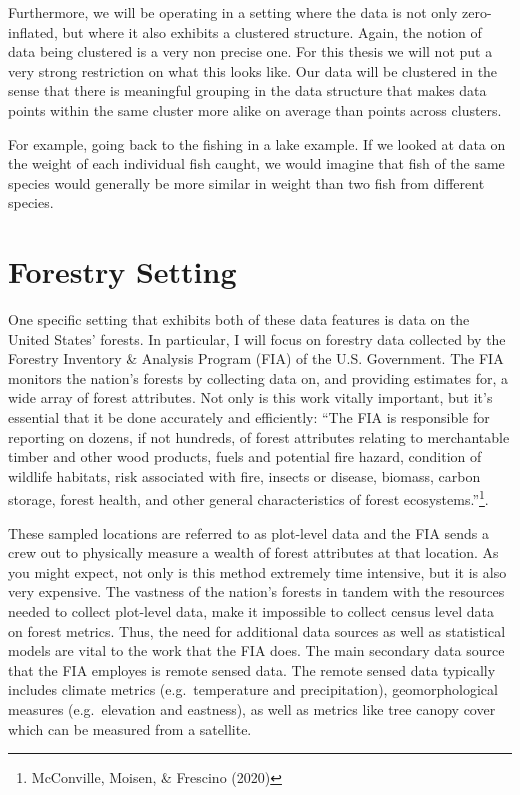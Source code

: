 \documentclass[12pt,twoside]{reedthesis}
\begin{document}
Furthermore, we will be operating in a setting where the data is not only zero-inflated, but where it also exhibits a clustered structure. Again, the notion of data being clustered is a very non precise one. For this thesis we will not put a very strong restriction on what this looks like. Our data will be clustered in the sense that there is meaningful grouping in the data structure that makes data points within the same cluster more alike on average than points across clusters.

For example, going back to the fishing in a lake example. If we looked at data on the weight of each individual fish caught, we would imagine that fish of the same species would generally be more similar in weight than two fish from different species.

\hypertarget{forestry-setting}{%
\section{Forestry Setting}\label{forestry-setting}}

One specific setting that exhibits both of these data features is data on the United States' forests. In particular, I will focus on forestry data collected by the Forestry Inventory \& Analysis Program (FIA) of the U.S. Government. The FIA monitors the nation's forests by collecting data on, and providing estimates for, a wide array of forest attributes. Not only is this work vitally important, but it's essential that it be done accurately and efficiently: ``The FIA is responsible for reporting on dozens, if not hundreds, of forest attributes relating to merchantable timber and other wood products, fuels and potential fire hazard, condition of wildlife habitats, risk associated with fire, insects or disease, biomass, carbon storage, forest health, and other general characteristics of forest ecosystems.''\footnote{McConville, Moisen, \& Frescino (2020)}.

These sampled locations are referred to as plot-level data and the FIA sends a crew out to physically measure a wealth of forest attributes at that location. As you might expect, not only is this method extremely time intensive, but it is also very expensive. The vastness of the nation's forests in tandem with the resources needed to collect plot-level data, make it impossible to collect census level data on forest metrics. Thus, the need for additional data sources as well as statistical models are vital to the work that the FIA does. The main secondary data source that the FIA employes is remote sensed data. The remote sensed data typically includes climate metrics (e.g.~temperature and precipitation), geomorphological measures (e.g.~elevation and eastness), as well as metrics like tree canopy cover which can be measured from a satellite.
\end{document}
